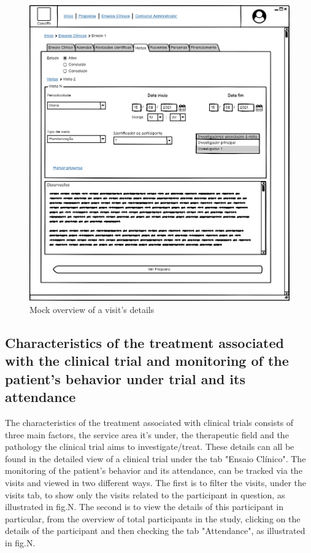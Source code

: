 \begin{figure}
    \centering
    \includegraphics{images/ensaio-visita-detalhes.png}
    \caption{Mock overview of a visit's details}
    \label{fig:ensaio-visita-detalhes}
\end{figure}


\subsection{Characteristics of the treatment associated with the clinical trial and monitoring of the patient’s behavior under trial and its attendance}
The characteristics of the treatment associated with clinical trials consists of three main factors, the service area it's under, the therapeutic field and the pathology the clinical trial aims to investigate/treat. These details can all be found in the detailed view of a clinical trial under the tab "Ensaio Clínico".  
The monitoring of the patient's behavior and its attendance, can be tracked via the visits and viewed in two different ways. The first is to filter the visits, under the visits tab, to show only the visits related to the participant in question, as illustrated in fig.N. The second is to view the details of this participant in particular, from the overview of total participants in the study, clicking on the details of the participant and then checking the tab "Attendance", as illustrated in fig.N. 


